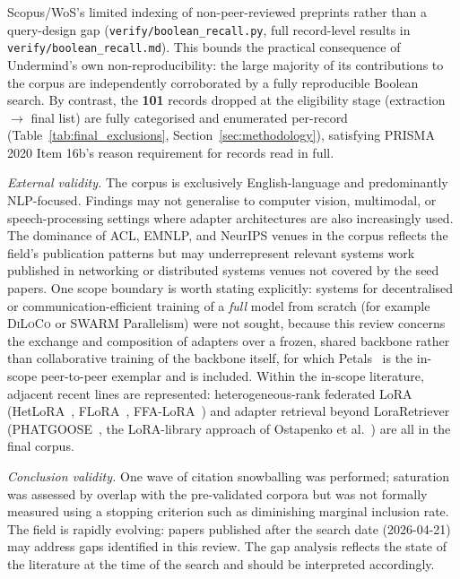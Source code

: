 Scopus/WoS's limited indexing of non-peer-reviewed preprints rather than a query-design gap (\texttt{verify/boolean\_recall.py}, full record-level results in \texttt{verify/boolean\_recall.md}). This bounds the practical consequence of Undermind's own non-reproducibility: the large majority of its contributions to the corpus are independently corroborated by a fully reproducible Boolean search. By contrast,
 the \textbf{101} records dropped at the eligibility stage (extraction $\rightarrow$
 final list) are fully categorised and enumerated per-record
 (Table~\ref{tab:final_exclusions}, Section~\ref{sec:methodology}),
 satisfying PRISMA 2020 Item 16b's reason requirement for records read in
 full.

\textit{External validity.}
The corpus is exclusively English-language and predominantly NLP-focused. Findings may not generalise to computer vision, multimodal, or speech-processing settings where adapter architectures are also increasingly used. The dominance of ACL, EMNLP, and NeurIPS venues in the corpus reflects the field's publication patterns but may underrepresent relevant systems work published in networking or distributed systems venues not covered by the seed papers.
One scope boundary is worth stating explicitly: systems for decentralised or
communication-efficient training of a \emph{full} model from scratch (for
example \textsc{DiLoCo} or \textsc{SWARM} Parallelism) were not sought, because
this review concerns the exchange and composition of adapters over a frozen,
shared backbone rather than collaborative training of the backbone itself,
for which Petals~\cite{Borzunov2023} is the in-scope peer-to-peer exemplar and
is included. Within the in-scope literature, adjacent recent lines are
represented: heterogeneous-rank federated LoRA
(HetLoRA~\cite{ChoHeteroLoRA2024}, FLoRA~\cite{WangFLoRA2024},
FFA-LoRA~\cite{SunImprovingLoRA2024}) and adapter retrieval beyond
LoraRetriever~\cite{ZhaoLoraRetriever2024}
(PHATGOOSE~\cite{Muqeeth2024}, the LoRA-library approach of Ostapenko et
al.~\cite{Ostapenko2024}) are all in the final corpus.

\textit{Conclusion validity.}
One wave of citation snowballing was performed; saturation was assessed by overlap with the pre-validated corpora but was not formally measured using a stopping criterion such as diminishing marginal inclusion rate. The field is rapidly evolving: papers published after the search date (2026-04-21) may address gaps identified in this review. The gap analysis reflects the state of the literature at the time of the search and should be interpreted accordingly.

